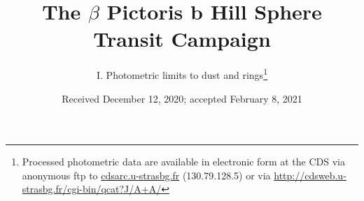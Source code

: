 \documentclass[longauth]{aa} %
\begin{document}
\title{The $\beta$ Pictoris b Hill Sphere Transit Campaign}
\subtitle{I. Photometric limits to dust and rings\thanks{Processed photometric data are available in electronic form at the CDS via anonymous ftp to \url{cdsarc.u-strasbg.fr} (130.79.128.5) or via \url{http://cdsweb.u-strasbg.fr/cgi-bin/qcat?J/A+A/}}}




\date{Received December 12, 2020; accepted February 8, 2021}
\end{document}
